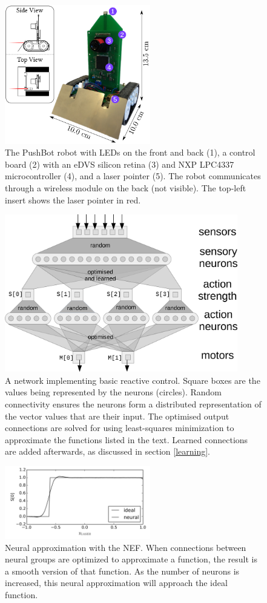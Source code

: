 \documentclass{frontiersSCNS}
\begin{document}
\begin{figure}[h!]
\centering
\includegraphics[width=2.5in]{../figures/Pushbot.png}
\caption{The PushBot robot with LEDs on the front and back (1), a control
board (2) with an eDVS silicon retina (3) and NXP LPC4337 microcontroller (4),
and a laser pointer (5).  The robot communicates through a wireless module on
the back (not visible).  The top-left insert shows the laser pointer in red.}
\label{fig_sim}
\end{figure}

\begin{figure}[h!]
\centering
\includegraphics[width=4in]{../figures/network.png}
\caption{A network implementing basic reactive control. Square boxes are the
values being represented by the neurons (circles).  Random connectivity
ensures the neurons form a distributed representation of the vector values
that are their input.  The optimised output connections are solved for
using least-squares minimization to approximate the functions listed in
the text.  Learned connections are added afterwards, as discussed in 
section \ref{learning}.}
\label{Flow}
\end{figure}

\begin{figure}[h!]
\centering
\includegraphics[width=2.5in]{../figures/smoothing.png}
\caption{Neural approximation with the NEF. When connections between neural groups are optimized to approximate a function, the result is a smooth version of that function. As the number of neurons is increased, this neural approximation will approach the ideal function.}
\label{NEF}
\end{figure}
\end{document}
